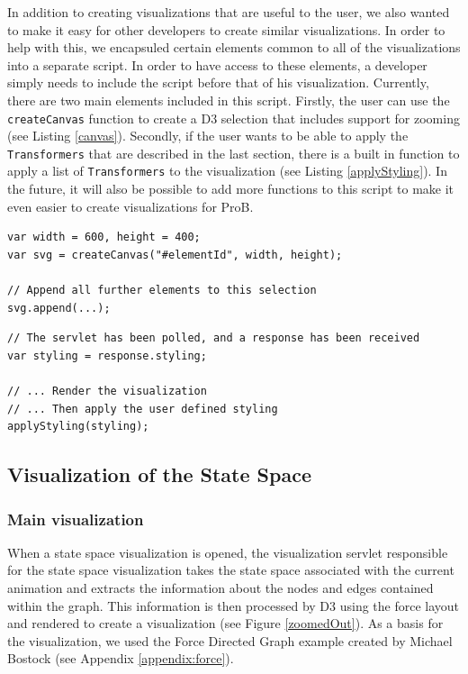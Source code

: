In addition to creating visualizations that are useful to the user, we also wanted to make it easy for other developers to create similar visualizations. In order to help with this, we encapsuled certain elements common to all of the visualizations into a separate script. In order to have access to these elements, a developer simply needs to include the script before that of his visualization. Currently, there are two main elements included in this script. Firstly, the user can use the \texttt{createCanvas} function to create a D3 selection that includes support for zooming (see Listing \ref{canvas}). Secondly, if the user wants to be able to apply the \texttt{Transformers} that are described in the last section, there is a built in function to apply a list of \texttt{Transformers} to the visualization (see Listing \ref{applyStyling}). In the future, it will also be possible to add more functions to this script to make it even easier to create visualizations for ProB.

\begin{lstlisting}[caption=Append a D3 selection to an element that includes support for zooming,label=canvas]
var width = 600, height = 400;
var svg = createCanvas("#elementId", width, height);

// Append all further elements to this selection
svg.append(...);
\end{lstlisting}

\begin{lstlisting}[caption=Apply list of \texttt{Transformers} received from servlet,label=applyStyling]
// The servlet has been polled, and a response has been received
var styling = response.styling;

// ... Render the visualization
// ... Then apply the user defined styling
applyStyling(styling);
\end{lstlisting}


\subsection{Visualization of the State Space}

\subsubsection{Main visualization}

When a state space visualization is opened, the visualization servlet responsible for the state space visualization takes the state space associated with the current animation and extracts the information about the nodes and edges contained within the graph. This information is then processed by D3 using the force layout and rendered to create a visualization (see Figure \ref{zoomedOut}). As a basis for the visualization, we used the Force Directed Graph example created by Michael Bostock (see Appendix \ref{appendix:force}). 

